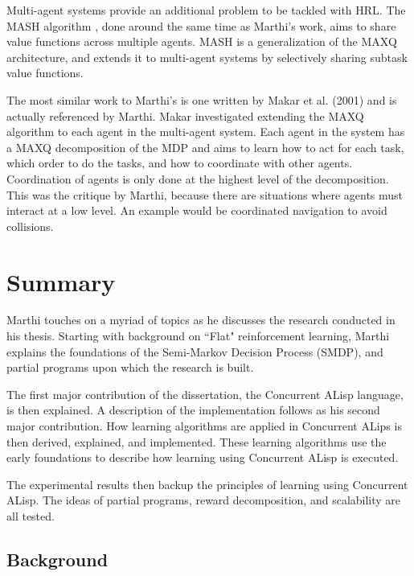 \documentclass[jair,twoside,11pt,theapa]{article}
\begin{document}
Multi-agent systems provide an additional problem to be tackled with HRL. The MASH algorithm \cite{mehta:2005}, done around the same time as Marthi's work, aims to share value functions across multiple agents. MASH is a generalization of the MAXQ architecture, and extends it to multi-agent systems by selectively sharing subtask value functions.

The most similar work to Marthi's is one written by Makar et al. (2001) and is actually referenced by Marthi. Makar investigated extending the MAXQ algorithm to each agent in the multi-agent system. Each agent in the system has a MAXQ decomposition of the MDP and aims to learn how to act for each task, which order to do the tasks, and how to coordinate with other agents. Coordination of agents is only done at the highest level of the decomposition. This was the critique by Marthi, because there are situations where agents must interact at a low level. An example would be coordinated navigation to avoid collisions. 


\section{Summary}
\label{Summary}
Marthi touches on a myriad of topics as he discusses the research conducted in his thesis. Starting with background on ``Flat" reinforcement learning, Marthi explains the foundations of the Semi-Markov Decision Process (SMDP), and partial programs upon which the research is built.

The first major contribution of the dissertation, the Concurrent ALisp language, is then explained. A description of the implementation follows as his second major contribution. How learning algorithms are applied in Concurrent ALips is then derived, explained, and implemented. These learning algorithms use the early foundations to describe how learning using Concurrent ALisp is executed.

The experimental results then backup the principles of learning using Concurrent ALisp. The ideas of partial programs, reward decomposition, and scalability are all tested.

\subsection{Background}
\label{Background}
\end{document}
